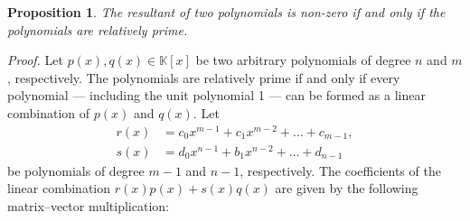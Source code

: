 \documentclass[12pt]{article}
\newcommand{\kfield}{\mathbb{K}}
\newtheorem{proposition}{Proposition}
\begin{document}

\begin{proposition}
  The resultant of two polynomials is non-zero if and only if the
  polynomials are  relatively prime.
\end{proposition}
{\em Proof.} Let $p(x), q(x)\in \kfield[x]$ be two arbitrary
polynomials of degree $n$ and $m$, respectively.  The polynomials are
relatively prime if and only if every polynomial --- including the
unit polynomial 1 --- can be formed as a linear combination of $p(x)$
and $q(x)$.  Let
\begin{align*}
r(x) &= c_0 x^{m-1} + c_1 x^{m-2} + \ldots + c_{m-1},\\
s(x) &= d_0 x^{n-1} + b_1 x^{n-2} + \ldots + d_{n-1}
\end{align*}
be polynomials of degree
$m-1$ and $n-1$, respectively.  The coefficients of the linear
combination
$r(x) p(x) + s(x) q(x)$ are given by the following matrix--vector
multiplication:
\end{document}
